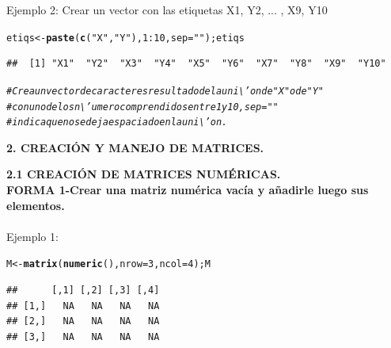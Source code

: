 \documentclass[12pt,letterpaper]{article}\usepackage[]{graphicx}\usepackage[]{color}
\makeatletter
\newcommand{\hlnum}[1]{\textcolor[rgb]{0.686,0.059,0.569}{#1}}%
\newcommand{\hlstr}[1]{\textcolor[rgb]{0.192,0.494,0.8}{#1}}%
\newcommand{\hlcom}[1]{\textcolor[rgb]{0.678,0.584,0.686}{\textit{#1}}}%
\newcommand{\hlopt}[1]{\textcolor[rgb]{0,0,0}{#1}}%
\newcommand{\hlstd}[1]{\textcolor[rgb]{0.345,0.345,0.345}{#1}}%
\newcommand{\hlkwb}[1]{\textcolor[rgb]{0.69,0.353,0.396}{#1}}%
\newcommand{\hlkwc}[1]{\textcolor[rgb]{0.333,0.667,0.333}{#1}}%
\newcommand{\hlkwd}[1]{\textcolor[rgb]{0.737,0.353,0.396}{\textbf{#1}}}%
\newenvironment{kframe}{%
 \def\at@end@of@kframe{}%
 \ifinner\ifhmode%
  \def\at@end@of@kframe{\end{minipage}}%
  \begin{minipage}{\columnwidth}%
 \fi\fi%
 \def\FrameCommand##1{\hskip\@totalleftmargin \hskip-\fboxsep
 \colorbox{shadecolor}{##1}\hskip-\fboxsep
     \hskip-\linewidth \hskip-\@totalleftmargin \hskip\columnwidth}%
 \MakeFramed {\advance\hsize-\width
   \@totalleftmargin\z@ \linewidth\hsize
   \@setminipage}}%
 {\par\unskip\endMakeFramed%
 \at@end@of@kframe}
\newenvironment{knitrout}{}{} %
\makeatother
\begin{document}
Ejemplo 2: Crear un vector con las etiquetas X1, Y2, ... , X9, Y10
\begin{knitrout}
\color{fgcolor}\begin{kframe}
\begin{alltt}
\hlstd{etiqs}\hlkwb{<-}\hlkwd{paste}\hlstd{(}\hlkwd{c}\hlstd{(}\hlstr{"X"}\hlstd{,} \hlstr{"Y"}\hlstd{),} \hlnum{1}\hlopt{:}\hlnum{10}\hlstd{,} \hlkwc{sep}\hlstd{=}\hlstr{""}\hlstd{); etiqs}
\end{alltt}
\begin{verbatim}
##  [1] "X1"  "Y2"  "X3"  "Y4"  "X5"  "Y6"  "X7"  "Y8"  "X9"  "Y10"
\end{verbatim}
\begin{alltt}
\hlcom{# Crea un vector de caracteres resultado de la uni\textbackslash{}'on de "X" o de "Y"}
\hlcom{#con uno de los n\textbackslash{}'umero comprendidos entre 1 y 10, sep="" }
\hlcom{#indica que no se deja espaciado en la uni\textbackslash{}'on.}
\end{alltt}
\end{kframe}
\end{knitrout}
\begin{center}
\textbf{2. CREACI\'ON Y MANEJO DE MATRICES.}\\
\end{center}

\textbf{2.1 CREACI\'ON DE MATRICES NUM\'ERICAS.}\\

\textbf{FORMA 1-Crear una matriz num\'erica vac\'ia y a\~nadirle luego sus elementos.}\\

\\ Ejemplo 1:
\begin{knitrout}
\color{fgcolor}\begin{kframe}
\begin{alltt}
\hlstd{M} \hlkwb{<-} \hlkwd{matrix}\hlstd{(}\hlkwd{numeric}\hlstd{(),} \hlkwc{nrow} \hlstd{=} \hlnum{3}\hlstd{,} \hlkwc{ncol}\hlstd{=}\hlnum{4}\hlstd{);M}
\end{alltt}
\begin{verbatim}
##      [,1] [,2] [,3] [,4]
## [1,]   NA   NA   NA   NA
## [2,]   NA   NA   NA   NA
## [3,]   NA   NA   NA   NA
\end{verbatim}
\end{kframe}
\end{knitrout}
\end{document}
